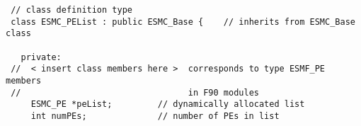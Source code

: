 
\begin{verbatim}
 // class definition type
 class ESMC_PEList : public ESMC_Base {    // inherits from ESMC_Base class

   private:
 //  < insert class members here >  corresponds to type ESMF_PE members
 //                                 in F90 modules
     ESMC_PE *peList;         // dynamically allocated list
     int numPEs;              // number of PEs in list
\end{verbatim}
